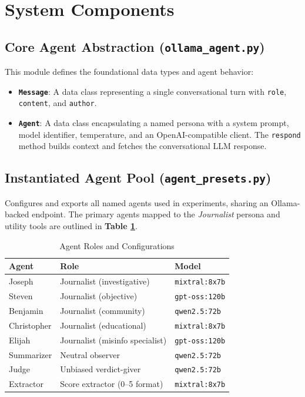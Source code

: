 \documentclass[sigconf,nonacm]{acmart}
\begin{document}
\section{System Components}\label{sec:components}

\subsection{Core Agent Abstraction (\texttt{ollama\_agent.py})}\label{sec:core_agent}
This module defines the foundational data types and agent behavior:
\begin{itemize}
    \item \textbf{\texttt{Message}}: A data class representing a single conversational turn with \texttt{role}, \texttt{content}, and \texttt{author}.
    \item \textbf{\texttt{Agent}}: A data class encapsulating a named persona with a system prompt, model identifier, temperature, and an OpenAI-compatible client. The \texttt{respond} method builds context and fetches the conversational LLM response.
\end{itemize}

\subsection{Instantiated Agent Pool (\texttt{agent\_presets.py})}\label{sec:agent_pool}
Configures and exports all named agents used in experiments, sharing an Ollama-backed endpoint. The primary agents mapped to the \textit{Journalist} persona and utility tools are outlined in \textbf{Table \ref{tab:roles}}.

\begin{table}[h]
    \centering
    \caption{Agent Roles and Configurations}
    \label{tab:roles}
    \begin{tabular}{lll}
        \toprule
        \textbf{Agent} & \textbf{Role} & \textbf{Model} \\
        \midrule
        Joseph & Journalist (investigative) & \texttt{mixtral:8x7b} \\
        Steven & Journalist (objective) & \texttt{gpt-oss:120b} \\
        Benjamin & Journalist (community) & \texttt{qwen2.5:72b} \\
        Christopher & Journalist (educational) & \texttt{mixtral:8x7b} \\
        Elijah & Journalist (misinfo specialist) & \texttt{gpt-oss:120b} \\
        Summarizer & Neutral observer & \texttt{qwen2.5:72b} \\
        Judge & Unbiased verdict-giver & \texttt{qwen2.5:72b} \\
        Extractor & Score extractor (0--5 format) & \texttt{mixtral:8x7b} \\
        \bottomrule
    \end{tabular}
\end{table}
\end{document}

